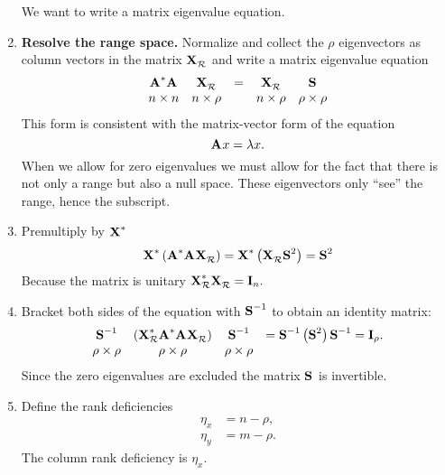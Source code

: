 \begin{enumerate}
\begin{equation}
\end{equation}
\subitem We want to write a matrix eigenvalue equation.
\item \textbf{Resolve the range space.} Normalize and collect the $\rho$ eigenvectors as column vectors in the matrix $\textbf{X}^{\mathrm{}}_{\mathcal{R}}$ and write a matrix eigenvalue equation
\begin{equation}
\begin{array}{ccccc}
  \textbf{A}^{\mathrm{ \mathrm{*} }}\textbf{A}^{\mathrm{}}&\textbf{X}^{\mathrm{}}_{\mathcal{R}} &=& \textbf{X}^{\mathrm{}}_{\mathcal{R}}&\textbf{S}^{\mathrm{}}\\
  n \times n & n \times \rho && n \times \rho & \rho \times \rho
  \label{eq:proofs:a}
\end{array}
\end{equation}
\subitem This form is consistent with the matrix-vector form of the equation
\begin{equation}
  \textbf{A}^{\mathrm{}}x = \lambda x.
\end{equation}
\subitem When we allow for zero eigenvalues we must allow for the fact that there is not only a range but also a null space. These eigenvectors only ``see'' the range, hence the subscript.
\item Premultiply by $\textbf{X}^{\mathrm{*}}$
\begin{equation}
  \begin{split}
     \textbf{X}^{\mathrm{*}}\left( \textbf{A}^{\mathrm{ \mathrm{*} }}\textbf{A}^{\mathrm{}}\textbf{X}^{\mathrm{}}_{\mathcal{R}} \right) = \textbf{X}^{\mathrm{*}}\left( \textbf{X}^{\mathrm{}}_{\mathcal{R}}\textbf{S}^{\mathrm{2}} \right) = \textbf{S}^{\mathrm{2}}
   \end{split}
 \label{eq:proofs:b}
\end{equation}
\subitem Because the matrix is unitary $\textbf{X}^{\mathrm{*}}_{\mathcal{R}}\textbf{X}^{\mathrm{}}_{\mathcal{R}} = \textbf{I}_{n}.$
\item Bracket both sides of the equation with $\textbf{S}^{\mathrm{-1}}$ to obtain an identity matrix:
\begin{equation}
\begin{array}{cccl}
  \textbf{S}^{\mathrm{-1}} & \left( \textbf{X}^{\mathrm{*}}_{\mathcal{R}}\textbf{A}^{\mathrm{ \mathrm{*} }}\textbf{A}^{\mathrm{}}\textbf{X}^{\mathrm{}}_{\mathcal{R}} \right) & \textbf{S}^{\mathrm{-1}} & = \textbf{S}^{\mathrm{-1}}\left( \textbf{S}^{\mathrm{2}} \right)\textbf{S}^{\mathrm{-1}} = \textbf{I}_{\rho}.\\
  \rho \times \rho & \rho \times \rho & \rho \times \rho 
\end{array}
\end{equation}
\subitem Since the zero eigenvalues are excluded the matrix $\textbf{S}^{\mathrm{}}$ is invertible.
\item Define the rank deficiencies
\begin{equation}
  \begin{split}
     \eta_{x} &= n - \rho,\\
     \eta_{y} &= m - \rho.
  \end{split}
\end{equation}
\subitem The column rank deficiency is $\eta_{x}$.

\end{enumerate}
